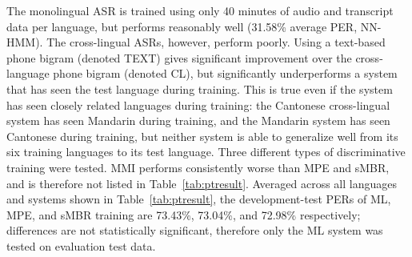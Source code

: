 The monolingual ASR is trained using only 40 minutes of audio and
transcript data per language, but performs reasonably well (31.58\%
average PER, NN-HMM).  The cross-lingual ASRs, however, perform poorly.
Using a text-based phone bigram (denoted {\sc TEXT}) gives significant
improvement over the cross-language phone bigram (denoted {\sc CL}),
but significantly underperforms a system that has seen the test
language during training.  This is true even if the system has seen
closely related languages during training: the Cantonese cross-lingual
system has seen Mandarin during training, and the Mandarin system has
seen Cantonese during training, but neither system is able to
generalize well from its six training languages to its test language.
{\color{blue} Three different types of discriminative training were
  tested.  MMI performs consistently worse than MPE and sMBR, and is
  therefore not listed in Table~\ref{tab:ptresult}.  Averaged across
  all languages and systems shown in Table~\ref{tab:ptresult}, the
  development-test PERs of ML, MPE, and sMBR training are 73.43\%,
  73.04\%, and 72.98\% respectively; differences are not statistically
  significant, therefore only the ML system was tested on evaluation
  test data.}

